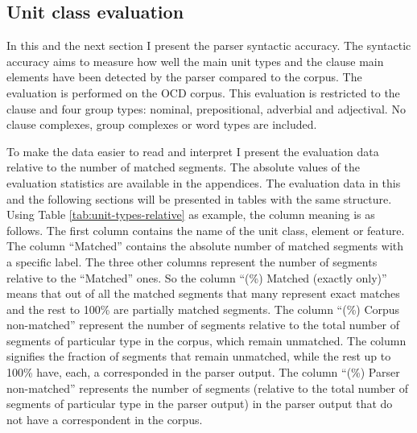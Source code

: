 \subsection{Unit class evaluation}
\label{sec:unit-class-evaluation}
    In this and the next section I present the parser syntactic accuracy. The syntactic accuracy aims to measure how well the main unit types and the clause main elements have been detected by the parser compared to the corpus. The evaluation is performed on the OCD corpus. This evaluation is restricted to the clause and four group types: nominal, prepositional, adverbial and adjectival. No clause complexes, group complexes or word types are included. 
    
    To make the data easier to read and interpret I present the evaluation data relative to the number of matched segments. The absolute values of the evaluation statistics are available in the appendices. The evaluation data in this and the following sections will be presented in tables with the same structure. Using Table \ref{tab:unit-types-relative} as example, the column meaning is as follows. The first column contains the name of the unit class, element or feature. The column ``Matched'' contains the absolute number of matched segments with a specific label. The three other columns represent the number of segments relative to the ``Matched'' ones. So the column ``(\%) Matched (exactly only)'' means that out of all the matched segments that many represent exact matches and the rest to 100\% are partially matched segments. The column ``(\%) Corpus non-matched'' represent the number of segments relative to the total number of segments of particular type in the corpus, which remain unmatched. The column signifies the fraction of segments that remain unmatched, while the rest up to 100\% have, each, a corresponded in the parser output. The column ``(\%) Parser non-matched'' represents the number of segments (relative to the total number of segments of particular type in the parser output) in the parser output that do not have a correspondent in the corpus.
    
